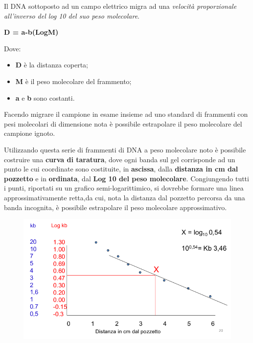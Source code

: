 \documentclass[]{article}
\begin{document}
Il DNA sottoposto ad un campo elettrico migra ad una \emph{velocità
proporzionale all'inverso del log 10 del suo peso molecolare}.

\textbf{D = a-b(LogM)}

Dove:

\begin{itemize}
\itemsep1pt\parskip0pt
\item
  \textbf{D} è la distanza coperta;
\item
  \textbf{M} è il peso molecolare del frammento;
\item
  \textbf{a} e \textbf{b} sono costanti.
\end{itemize}

Facendo migrare il campione in esame insieme ad uno standard di
frammenti con pesi molecolari di dimensione nota è possibile estrapolare
il peso molecolare del campione ignoto.

Utilizzando questa serie di frammenti di DNA a peso molecolare noto è
possibile costruire una \textbf{curva di taratura}, dove ogni banda sul
gel corrisponde ad un punto le cui coordinate sono costituite, in
\textbf{ascissa}, dalla \textbf{distanza in cm dal pozzetto} e in
\textbf{ordinata}, dal \textbf{Log 10 del peso molecolare}. Congiungendo
tutti i punti, riportati su un grafico semi-logarittimico, si dovrebbe
formare una linea approssimativamente retta,da cui, nota la distanza dal
pozzetto percorsa da una banda incognita, è possibile estrapolare il
peso molecolare approssimativo.

\begin{figure}[htp]
\centering
\includegraphics[scale=1.00]{img/65_Grafico peso molecolare elettroforesi.png}
\caption{}
\label{grafico-peso-molecolare-elettroforesi}
\end{figure}
\end{document}
